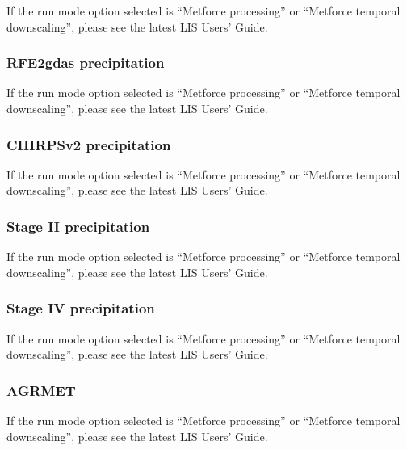  If the run mode option selected is ``Metforce processing'' or
 ``Metforce temporal downscaling'', please see the latest LIS Users'
 Guide.

 

 
 \subsubsection{RFE2gdas precipitation} 

 If the run mode option selected is ``Metforce processing'' or
 ``Metforce temporal downscaling'', please see the latest LIS Users'
 Guide.

 

 
 \subsubsection{CHIRPSv2 precipitation} 

 If the run mode option selected is ``Metforce processing'' or
 ``Metforce temporal downscaling'', please see the latest LIS Users'
 Guide.

 

 
 \subsubsection{Stage II precipitation}

 If the run mode option selected is ``Metforce processing'' or
 ``Metforce temporal downscaling'', please see the latest LIS Users'
 Guide.

 

 
 \subsubsection{Stage IV precipitation} 

 If the run mode option selected is ``Metforce processing'' or
 ``Metforce temporal downscaling'', please see the latest LIS Users'
 Guide.

 

 
 
 \subsubsection{AGRMET} 

 If the run mode option selected is ``Metforce processing'' or
 ``Metforce temporal downscaling'', please see the latest LIS Users'
 Guide.

 
 


